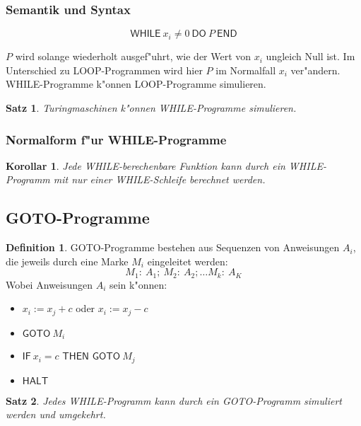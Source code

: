 \documentclass[german, 10pt, a4paper, twocolumn]{scrartcl}
\newtheorem{satz}{Satz}[section]
\newtheorem{korollar}{Korollar}[section]
\theoremstyle{definition}
\newtheorem*{definition}{Definition}
\theoremstyle{example}
\begin{document}
\subsubsection{Semantik und Syntax}

\begin{displaymath}
	\textsf{WHILE} \ x_i \neq 0 \ \textsf{DO} \ P \ \textsf{END}
\end{displaymath}

$P$ wird solange wiederholt ausgef"uhrt, wie der Wert von $x_i$ ungleich Null ist. Im Unterschied zu LOOP-Programmen wird hier $P$ im Normalfall $x_i$ ver"andern. WHILE-Programme k"onnen LOOP-Programme simulieren.

\begin{satz}
	Turingmaschinen k"onnen WHILE-Programme simulieren.
\end{satz}

\subsubsection{Normalform f"ur WHILE-Programme}

\begin{korollar}
	Jede WHILE-berechenbare Funktion kann durch ein WHILE-Programm mit nur einer WHILE-Schleife berechnet werden.
\end{korollar}

\subsection{GOTO-Programme}

\begin{definition}
	GOTO-Programme bestehen aus Sequenzen von Anweisungen $A_i$, die jeweils durch eine Marke $M_i$ eingeleitet werden:
		\begin{displaymath}
			M_1 : \ A_1; \ M_2 : \ A_2; \ldots M_k : \ A_K
		\end{displaymath}
	Wobei Anweisungen $A_i$ sein k"onnen:
	\begin{itemize}
		\item $x_i := x_j + c$ oder $x_i := x_j -c$
		\item $\textsf{GOTO} \ M_i$
		\item $\textsf{IF} \ x_i = c \textsf{ THEN GOTO} \  M_j$
		\item $\textsf{HALT}$
	\end{itemize}
\end{definition}

\begin{satz}
	Jedes WHILE-Programm kann durch ein GOTO-Programm simuliert werden und umgekehrt.
\end{satz}
\end{document}
